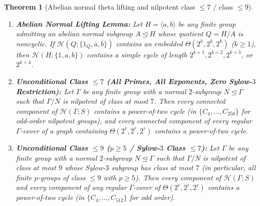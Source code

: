 \documentclass[11pt]{amsart}
\newtheorem{theorem}{Theorem}[section]
\theoremstyle{remark}
\newcommand{\Haar}{\mathcal{H}}
\begin{document}
\begin{theorem}[Abelian normal theta lifting and nilpotent class $\le 7$ / class $\le 9$]\label{thm:theta_lifting}
\leavevmode
\begin{enumerate}[label=(\alph*)]
\item \textbf{Abelian Normal Lifting Lemma:} Let $H = \langle a, b \rangle$ be any finite group admitting an abelian normal subgroup $A \trianglelefteq H$ whose quotient $Q = H/A$ is noncyclic. If $\Haar(Q; \{1_Q, \overline{a}, \overline{b}\})$ contains an embedded $\Theta(2^k, 2^k, 2^k)$ ($k \ge 1$), then $\Haar(H; \{1, a, b\})$ contains a simple cycle of length $2^{k+1}, 2^{k+2}, 2^{k+3}$, or $2^{k+4}$.
\item \textbf{Unconditional Class $\le 7$ (All Primes, All Exponents, Zero Sylow-$3$ Restriction):} Let $\Gamma$ be any finite group with a normal $2$-subgroup $N \trianglelefteq \Gamma$ such that $\Gamma/N$ is nilpotent of class at most $7$. Then every connected component of $\Haar(\Gamma; S)$ contains a power-of-two cycle (in $\{C_4, \dots, C_{256}\}$ for odd-order nilpotent groups), and every connected component of every regular $\Gamma$-cover of a graph containing $\Theta(2^r, 2^r, 2^r)$ contains a power-of-two cycle.
\item \textbf{Unconditional Class $\le 9$ ($p \ge 5$ / Sylow-$3$ Class $\le 7$):} Let $\Gamma$ be any finite group with a normal $2$-subgroup $N \trianglelefteq \Gamma$ such that $\Gamma/N$ is nilpotent of class at most $9$ whose Sylow-$3$ subgroup has class at most $7$ (in particular, all finite $p$-groups of class $\le 9$ with $p \ge 5$). Then every component of $\Haar(\Gamma; S)$ and every component of any regular $\Gamma$-cover of $\Theta(2^r, 2^r, 2^r)$ contains a power-of-two cycle (in $\{C_4, \dots, C_{512}\}$ for odd order).
\end{enumerate}
\end{theorem}
\end{document}
